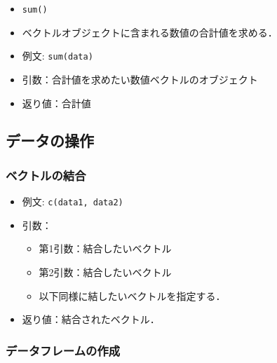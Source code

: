 \documentclass[
  xelatex, ja=standard]{bxjsarticle}
\providecommand{\tightlist}{%
  \setlength{\itemsep}{0pt}\setlength{\parskip}{0pt}}
\begin{document}
\begin{itemize}
\tightlist
\item
  \texttt{sum()}
\item
  ベクトルオブジェクトに含まれる数値の合計値を求める．
\item
  例文: \texttt{sum(data)}
\item
  引数：合計値を求めたい数値ベクトルのオブジェクト
\item
  返り値：合計値
\end{itemize}

\subsection{データの操作}\label{ux30c7ux30fcux30bfux306eux64cdux4f5c}

\subsubsection{ベクトルの結合}\label{ux30d9ux30afux30c8ux30ebux306eux7d50ux5408}

\begin{itemize}
\tightlist
\item
  例文: \texttt{c(data1,\ data2)}
\item
  引数：

  \begin{itemize}
  \tightlist
  \item
    第1引数：結合したいベクトル
  \item
    第2引数：結合したいベクトル
  \item
    以下同様に結したいベクトルを指定する．
  \end{itemize}
\item
  返り値：結合されたベクトル．
\end{itemize}

\subsubsection{データフレームの作成}\label{ux30c7ux30fcux30bfux30d5ux30ecux30fcux30e0ux306eux4f5cux6210}
\end{document}

